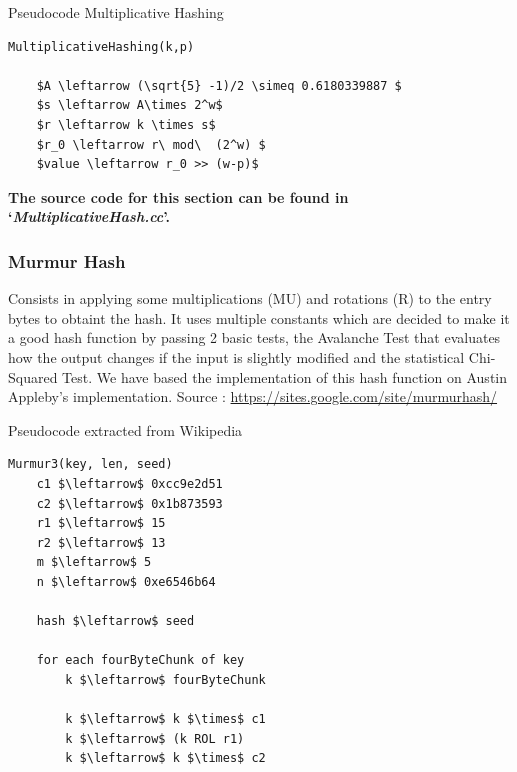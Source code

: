 \documentclass[12pt]{article}
\begin{document}
{\begin{center}
\begin{large}
Pseudocode Multiplicative Hashing
\end{large}
\end{center}

\begin{lstlisting}[mathescape=true]
MultiplicativeHashing(k,p)

	$A \leftarrow (\sqrt{5} -1)/2 \simeq 0.6180339887 $
	$s \leftarrow A\times 2^w$
	$r \leftarrow k \times s$ 
	$r_0 \leftarrow r\ mod\  (2^w) $ 
	$value \leftarrow r_0 >> (w-p)$

\end{lstlisting}

\textbf{The source code for this section can be found in `\textit{MultiplicativeHash.cc}'.}
\bigskip



\subsubsection{Murmur Hash}

Consists in applying some multiplications (MU) and rotations (R) to the entry bytes to obtaint the hash. It uses multiple constants which are decided to make it a good hash function by passing 2 basic tests, the Avalanche Test that evaluates how the output changes if the input is slightly modified and the statistical Chi-Squared Test. We have based the implementation of this hash function on Austin Appleby's implementation. Source : \url{https://sites.google.com/site/murmurhash/}\\
\medskip
\begin{center}
\begin{large}
Pseudocode extracted from Wikipedia
\end{large}
\end{center}

\begin{lstlisting}[mathescape=true]
Murmur3(key, len, seed)
    c1 $\leftarrow$ 0xcc9e2d51
    c2 $\leftarrow$ 0x1b873593
    r1 $\leftarrow$ 15
    r2 $\leftarrow$ 13
    m $\leftarrow$ 5
    n $\leftarrow$ 0xe6546b64
 
    hash $\leftarrow$ seed

    for each fourByteChunk of key
        k $\leftarrow$ fourByteChunk

        k $\leftarrow$ k $\times$ c1
        k $\leftarrow$ (k ROL r1)
        k $\leftarrow$ k $\times$ c2


\end{lstlisting}}
\end{document}
